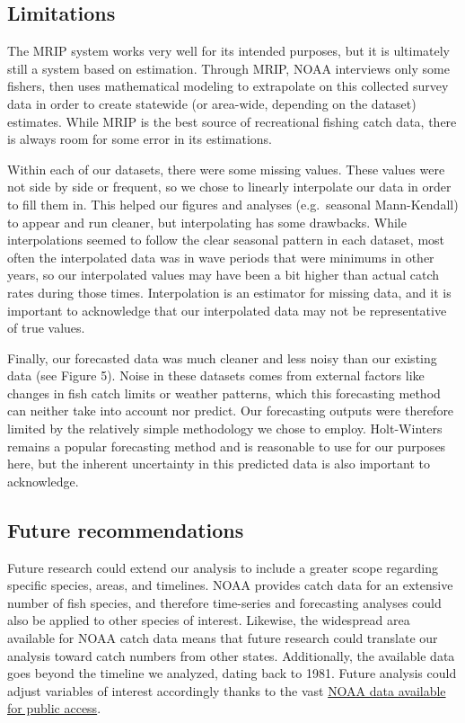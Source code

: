 \documentclass[
  12pt,
]{article}
\begin{document}
\hypertarget{limitations}{%
\subsection{Limitations}\label{limitations}}

The MRIP system works very well for its intended purposes, but it is
ultimately still a system based on estimation. Through MRIP, NOAA
interviews only some fishers, then uses mathematical modeling to
extrapolate on this collected survey data in order to create statewide
(or area-wide, depending on the dataset) estimates. While MRIP is the
best source of recreational fishing catch data, there is always room for
some error in its estimations.

Within each of our datasets, there were some missing values. These
values were not side by side or frequent, so we chose to linearly
interpolate our data in order to fill them in. This helped our figures
and analyses (e.g.~seasonal Mann-Kendall) to appear and run cleaner, but
interpolating has some drawbacks. While interpolations seemed to follow
the clear seasonal pattern in each dataset, most often the interpolated
data was in wave periods that were minimums in other years, so our
interpolated values may have been a bit higher than actual catch rates
during those times. Interpolation is an estimator for missing data, and
it is important to acknowledge that our interpolated data may not be
representative of true values.

Finally, our forecasted data was much cleaner and less noisy than our
existing data (see Figure 5). Noise in these datasets comes from
external factors like changes in fish catch limits or weather patterns,
which this forecasting method can neither take into account nor predict.
Our forecasting outputs were therefore limited by the relatively simple
methodology we chose to employ. Holt-Winters remains a popular
forecasting method and is reasonable to use for our purposes here, but
the inherent uncertainty in this predicted data is also important to
acknowledge.

\hypertarget{future-recommendations}{%
\subsection{Future recommendations}\label{future-recommendations}}

Future research could extend our analysis to include a greater scope
regarding specific species, areas, and timelines. NOAA provides catch
data for an extensive number of fish species, and therefore time-series
and forecasting analyses could also be applied to other species of
interest. Likewise, the widespread area available for NOAA catch data
means that future research could translate our analysis toward catch
numbers from other states. Additionally, the available data goes beyond
the timeline we analyzed, dating back to 1981. Future analysis could
adjust variables of interest accordingly thanks to the vast
\href{https://www.fisheries.noaa.gov/data-tools/recreational-fisheries-statistics-queries}{NOAA
data available for public access}.
\end{document}
